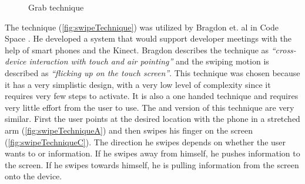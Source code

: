 \begin{figure}[H]
	\caption{Grab technique}
	\label{fig:grabTechnique}
\end{figure}

The \swipe technique (\cref{fig:swipeTechnique}) was utilized by Bragdon et. al in Code Space \cite{Bragdon:2011}.
He developed a system that would support developer meetings with the help of smart phones and the Kinect. Bragdon describes the technique as \emph{``cross-device interaction with touch and air pointing''} and the swiping motion is described as \emph{``flicking up on the touch screen''}.
This technique was chosen because it has a very simplistic design, with a very low level of complexity since it requires very few steps to activate.
It is also a one handed technique and requires very little effort from the user to use.
The \push and \pull version of this technique are very similar.
First the user points at the desired location with the phone in a stretched arm (\cref{fig:swipeTechniqueA}) and then swipes his finger on the screen (\cref{fig:swipeTechniqueC}).
The direction he swipes depends on whether the user wants to \push or \pull information.
If he swipes away from himself, he pushes information to the screen.
If he swipes towards himself, he is pulling information from the screen onto the device.  

